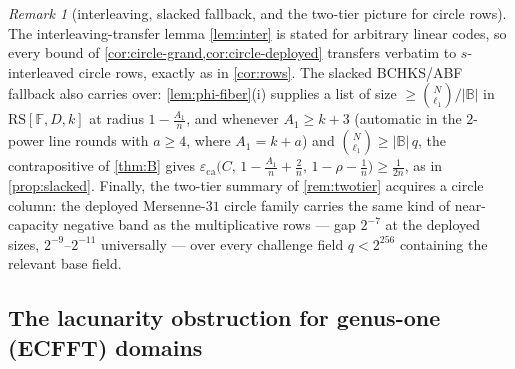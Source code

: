 \documentclass[11pt]{article}
\theoremstyle{definition}
\theoremstyle{remark}
\newtheorem{remark}[remark]{Remark}
\newcommand{\F}{\mathbb{F}}
\newcommand{\B}{\mathbb{B}}
\newcommand{\RS}{\mathrm{RS}}
\newcommand{\eca}{\varepsilon_{\mathrm{ca}}}
\begin{document}
\begin{remark}[interleaving, slacked fallback, and the two-tier picture for circle rows]\label{rem:circle-transfer}
The interleaving-transfer lemma \cref{lem:inter} is stated for arbitrary linear codes, so every bound of \cref{cor:circle-grand,cor:circle-deployed} transfers verbatim to $s$-interleaved circle rows, exactly as in \cref{cor:rows}. The slacked BCHKS/ABF fallback also carries over: \cref{lem:phi-fiber}(i) supplies a list of size $\ge\binom N{\ell_1}/|\B|$ in $\RS[\F,D,k]$ at radius $1-\frac{A_1}n$, and whenever $A_1\ge k+3$ \textup(automatic in the $2$-power line rounds with $a\ge4$, where $A_1=k+a$\textup) and $\binom N{\ell_1}\ge|\B|\,q$, the contrapositive of \cref{thm:B} gives $\eca\bigl(C,\,1-\frac{A_1}n+\frac2n,\,1-\rho-\frac1n\bigr)\ge\frac1{2n}$, as in \cref{prop:slacked}. Finally, the two-tier summary of \cref{rem:twotier} acquires a circle column: the deployed Mersenne-$31$ circle family carries the same kind of near-capacity negative band as the multiplicative rows --- gap $2^{-7}$ at the deployed sizes, $2^{-9}$--$2^{-11}$ universally --- over every challenge field $q<2^{256}$ containing the relevant base field.
\end{remark}

\subsection{The lacunarity obstruction for genus-one (ECFFT) domains}
\label{sec:ecfft}
\end{document}
